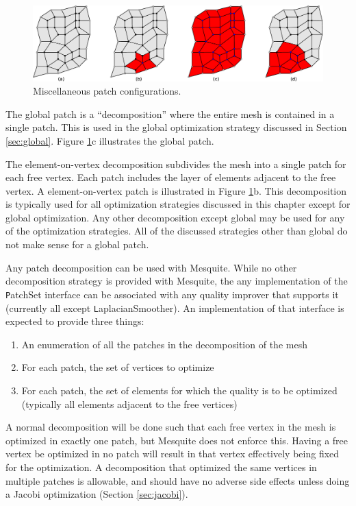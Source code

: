 \begin{figure}[htb]
\includegraphics[width=5in]{patches-horiz}
\caption{Miscellaneous patch configurations.\label{fig:patch-types}}
\end{figure}

The global patch is a ``decomposition'' where the entire mesh is contained in a single patch.  This is used in the global optimization strategy discussed in Section \ref{sec:global}. Figure \ref{fig:patch-types}c illustrates the global patch.

The element-on-vertex decomposition subdivides the mesh into a single patch for each free vertex.  Each patch includes the layer of elements adjacent to the free vertex.  A element-on-vertex patch is illustrated in Figure \ref{fig:patch-types}b.  This decomposition is typically used for all optimization strategies discussed in this chapter except for global optimization.  Any other decomposition except global may be used for any of the optimization strategies.  All of the discussed strategies other than global do not make sense for a global patch.

Any patch decomposition can be used with Mesquite.  While no other decomposition strategy is provided with Mesquite, the any implementation of the {\texttt PatchSet} interface can be associated with any quality improver that supports it (currently all except {\texttt LaplacianSmoother}).  An implementation of that interface is expected to provide three things:
\begin{enumerate}
\item An enumeration of all the patches in the decomposition of the mesh
\item For each patch, the set of vertices to optimize
\item For each patch, the set of elements for which the quality is to be optimized (typically all elements adjacent to the free vertices)
\end{enumerate}
A normal decomposition will be done such that each free vertex in the mesh is optimized in exactly one patch, but Mesquite does not enforce this.  Having a free vertex be optimized in no patch will result in that vertex effectively being fixed for the optimization.  A decomposition that optimized the same vertices in multiple patches is allowable, and should have no adverse side effects unless doing a Jacobi optimization (Section \ref{sec:jacobi}).

